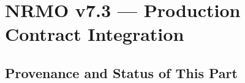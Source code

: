 
\part{NRMO v7.3 --- Production Contract Integration}
\label{part:v73_production_contract}

\chapter{Provenance and Status of This Part}
\label{ch:v73_provenance}

